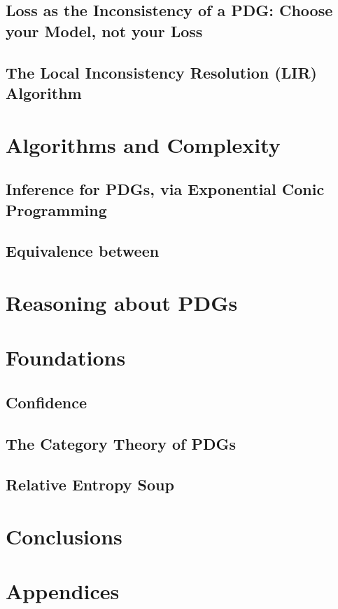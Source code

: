 \documentclass[tocprelim,
    ]{cornellmodified}
\begin{document}
\chapter{Loss as the Inconsistency of a PDG: 
    Choose your Model, not your Loss}
\chapter{ The Local Inconsistency Resolution (LIR) Algorithm }

\part{Algorithms and Complexity}

\chapter{Inference for PDGs, via Exponential Conic Programming}
\chapter{Equivalence between }

\part{Reasoning about PDGs}

\chapter{}

\part{Foundations}

\chapter{Confidence}
\chapter{The Category Theory of PDGs}
\chapter{Relative Entropy Soup}

\part{Conclusions}

\part{Appendices}
\end{document}
